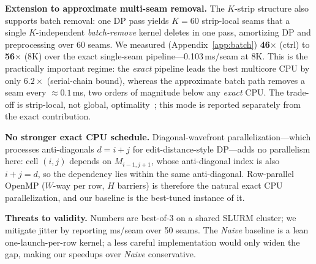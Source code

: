 \textbf{Extension to approximate multi-seam removal.}
The $K$-strip structure also supports batch removal: one DP pass yields $K{=}60$
strip-local seams that a single $K$-independent \emph{batch-remove} kernel
deletes in one pass, amortizing DP and preprocessing over 60 seams. We measured
(Appendix~\ref{app:batch}) \textbf{46$\times$} (ctrl) to \textbf{56$\times$} (8K)
over the exact single-seam pipeline---0.103\,ms/seam at 8K. This is the
practically important regime: the \emph{exact} pipeline leads the best multicore
CPU by only $6.2\times$ (serial-chain bound), whereas the approximate batch path
removes a seam every ${\approx}0.1$\,ms, two orders of magnitude below any
\emph{exact} CPU. The trade-off is strip-local, not global,
optimality~\cite{kim2015}; this mode is reported separately from the exact
contribution.

\textbf{No stronger exact CPU schedule.}
Diagonal-wavefront parallelization---which processes anti-diagonals $d{=}i{+}j$
for edit-distance-style DP---adds no parallelism here: cell $(i,j)$ depends on
$M_{i-1,j+1}$, whose anti-diagonal index is also $i{+}j{=}d$, so the dependency
lies within the same anti-diagonal. Row-parallel OpenMP ($W$-way per row, $H$
barriers) is therefore the natural exact CPU parallelization, and our baseline
is the best-tuned instance of it.

\textbf{Threats to validity.} Numbers are best-of-3 on a shared SLURM cluster;
we mitigate jitter by reporting ms/seam over 50 seams. The \emph{Naive} baseline
is a lean one-launch-per-row kernel; a less careful implementation would only
widen the gap, making our speedups over \emph{Naive} conservative.
